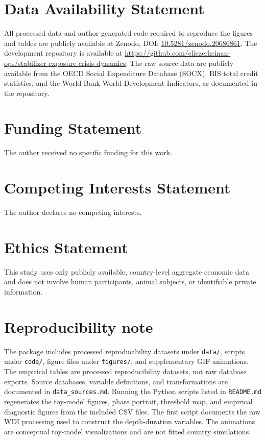\documentclass[11pt]{article}
\begin{document}
\section*{Data Availability Statement}
All processed data and author-generated code required to reproduce the figures and tables are publicly available at Zenodo, DOI: \href{https://doi.org/10.5281/zenodo.20686861}{10.5281/zenodo.20686861}. The development repository is available at \url{https://github.com/eliezerkeinan-ops/stabilizer-exposure-crisis-dynamics}. The raw source data are publicly available from the OECD Social Expenditure Database (SOCX), BIS total credit statistics, and the World Bank World Development Indicators, as documented in the repository.

\section*{Funding Statement}
The author received no specific funding for this work.

\section*{Competing Interests Statement}
The author declares no competing interests.

\section*{Ethics Statement}
This study uses only publicly available, country-level aggregate economic data and does not involve human participants, animal subjects, or identifiable private information.

\appendix
\section{Reproducibility note}
The package includes processed reproducibility datasets under \texttt{data/}, scripts under \texttt{code/}, figure files under \texttt{figures/}, and supplementary GIF animations. The empirical tables are processed reproducibility datasets, not raw database exports. Source databases, variable definitions, and transformations are documented in \texttt{data\_sources.md}. Running the Python scripts listed in \texttt{README.md} regenerates the toy-model figures, phase portrait, threshold map, and empirical diagnostic figures from the included CSV files. The first script documents the raw WDI processing used to construct the depth-duration variables. The animations are conceptual toy-model visualizations and are not fitted country simulations.
\end{document}

